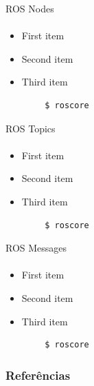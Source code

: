 \documentclass{beamer}
\begin{document}
\begin{frame}[fragile]{ROS Nodes}
	\framesubtitle{ }
	\begin{minipage}{0.47\textwidth}
    \begin{itemize}
        \item First item
        \item Second item
        \item Third item
    \end{itemize}
	\begin{lstlisting}
		$ roscore
    \end{lstlisting}
\end{minipage}
\begin{minipage}{0.5\textwidth}
	
\end{minipage}
\end{frame}



\begin{frame}[fragile]{ROS Topics}
	\framesubtitle{ }
	\begin{minipage}{0.47\textwidth}
    \begin{itemize}
        \item First item
        \item Second item
        \item Third item
    \end{itemize}
	\begin{lstlisting}
		$ roscore
    \end{lstlisting}
\end{minipage}
\begin{minipage}{0.5\textwidth}
	
\end{minipage}
\end{frame}



\begin{frame}[fragile]{ROS Messages}
	\framesubtitle{ }
	\begin{minipage}{0.47\textwidth}
    \begin{itemize}
        \item First item
        \item Second item
        \item Third item
    \end{itemize}
	\begin{lstlisting}
		$ roscore
    \end{lstlisting}
\end{minipage}
\begin{minipage}{0.5\textwidth}
	
\end{minipage}
\end{frame}



\begin{frame}[t, allowframebreaks]
	\frametitle{Referências}
	
\end{frame}
\end{document}

